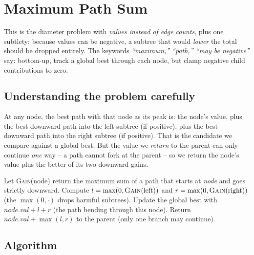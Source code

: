 \section{Maximum Path Sum}
\label{sec:trees-max-path-sum}


\begin{patternbox}
This is the diameter problem with \emph{values instead of edge counts},
plus one subtlety: because values can be negative, a subtree that would
\emph{lower} the total should be dropped entirely. The keywords
\emph{``maximum,'' ``path,'' ``may be negative''} say: bottom-up, track a
global best through each node, but clamp negative child contributions to
zero.
\end{patternbox}

\subsection*{Understanding the problem carefully}

At any node, the best path with that node as its peak is: the node's value,
plus the best downward path into the left subtree (if positive), plus the
best downward path into the right subtree (if positive). That is the
candidate we compare against a global best. But the value we \emph{return}
to the parent can only continue \emph{one} way -- a path cannot fork at the
parent -- so we return the node's value plus the better of its two
downward gains.

\begin{ideabox}
Let \textsc{Gain}(node) return the maximum sum of a path that starts at
\textit{node} and goes strictly downward. Compute
$l=\max(0,\textsc{Gain}(\text{left}))$ and
$r=\max(0,\textsc{Gain}(\text{right}))$ (the $\max(0,\cdot)$ drops
harmful subtrees). Update the global best with $node.val+l+r$ (the path
bending through this node). Return $node.val+\max(l,r)$ to the parent (only
one branch may continue).
\end{ideabox}

\subsection*{Algorithm}

